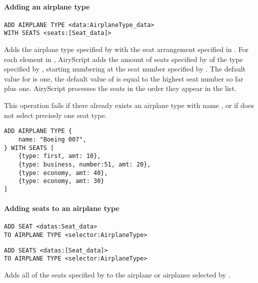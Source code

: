 \paragraph{Adding an airplane type}
\begin{operation}
  \begin{lstlisting}
ADD AIRPLANE TYPE <data:AirplaneType_data>
WITH SEATS <seats:[Seat_data]>
  \end{lstlisting}
  \label{op:add_airplane_type}
\end{operation}
Adds the airplane type specified by  with the seat arrangement
specified in . For each element in , AiryScript adds
the amount of seats specified by  of the type specified by ,
starting numbering at the seat number specified by .  The default
value for  is one, the default value of  is equal to the
highest seat number so far plus one. AiryScript processes the seats in the order
they appear in the  list.

This operation fails if there already exists an airplane type with name
, or if  does not select precisely one seat type.


\begin{texa}
  {
\begin{lstlisting}
ADD AIRPLANE TYPE {
    name: "Boeing 007",
} WITH SEATS [
    {type: first, amt: 10},
    {type: business, number:51, amt: 20},
    {type: economy, amt: 40},
    {type: economy, amt: 30}
]
\end{lstlisting}
  }
\end{texa}

\paragraph{Adding seats to an airplane type}
\begin{operation}
  \begin{lstlisting}
ADD SEAT <datas:Seat_data>
TO AIRPLANE TYPE <selector:AirplaneType>
  \end{lstlisting}
  \label{op:add_seats}
\end{operation}
\begin{operation}
  \begin{lstlisting}
ADD SEATS <datas:[Seat_data]>
TO AIRPLANE TYPE <selector:AirplaneType>
  \end{lstlisting}
  \label{op:add_seats}
\end{operation}
Adds all of the seats specified by  to the airplane or airplanes
selected by .

